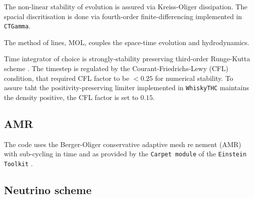 The non-linear stability of evolution is assured via Kreiss-Oliger dissipation. 
The spacial discritisation is done via fourth-order finite-differencing implemented in \texttt{CTGamma}.

The method of lines, MOL, couples the space-time evolution and hydrodynamics. 

Time integrator of choice is strongly-stability preserving third-order Runge-Kutta scheme \cite{Gottlieb:2009}.
The timestep is regulated by the Courant-Friedrichs-Lewy (CFL) condition, that required CFL factor 
to be $<0.25$ for numerical stability. To assure taht the positivity-preserving limiter implemented in \texttt{WhiskyTHC} maintains the density positive, the CFL factor is set to $0.15$.


\subsection{AMR}


The code uses the Berger-Oliger conservative adaptive mesh renement (AMR) \cite{Berger:1984} with 
sub-cycling in time and  \cite{Berger:1989,Reisswig:2012nc} as provided by the \texttt{Carpet module} of the \texttt{Einstein Toolkit} 
\cite{Schnetter:2003rb}. 


\subsection{Neutrino scheme}


